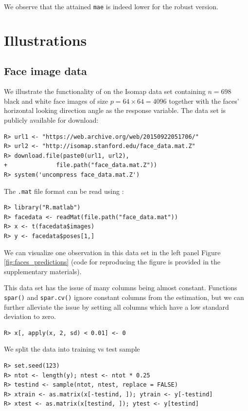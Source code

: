 \documentclass[
  article,
  nojss]{jss}
\begin{document}
We observe that the attained \texttt{mae} is indeed lower for the robust
version.

\section{Illustrations}\label{sec-illustrations}

\subsection{Face image data}\label{face-image-data}

We illustrate the functionality of  on the Isomap data set
containing \(n = 698\) black and white face images of size
\(p = 64 \times 64 = 4096\) together with the faces' horizontal looking
direction angle as the response variable. The data set is publicly
available for download:

\begin{verbatim}
R> url1 <- "https://web.archive.org/web/20150922051706/"
R> url2 <- "http://isomap.stanford.edu/face_data.mat.Z"
R> download.file(paste0(url1, url2),
+              file.path("face_data.mat.Z"))
R> system('uncompress face_data.mat.Z')
\end{verbatim}

The \texttt{.mat} file format can be read using 
\citep{pkg:rmatlab}:

\begin{verbatim}
R> library("R.matlab")
R> facedata <- readMat(file.path("face_data.mat"))
R> x <- t(facedata$images)
R> y <- facedata$poses[1,]
\end{verbatim}

We can visualize one observation in this data set in the left panel
Figure \ref{fig:faces_predictions} (code for reproducing the figure is
provided in the supplementary materials).

This data set has the issue of many columns being almost constant.
Functions \texttt{spar()} and \texttt{spar.cv()} ignore constant columns
from the estimation, but we can further alleviate the issue by setting
all columns which have a low standard deviation to zero.

\begin{verbatim}
R> x[, apply(x, 2, sd) < 0.01] <- 0
\end{verbatim}

We split the data into training vs test sample

\begin{verbatim}
R> set.seed(123)
R> ntot <- length(y); ntest <- ntot * 0.25
R> testind <- sample(ntot, ntest, replace = FALSE)
R> xtrain <- as.matrix(x[-testind, ]); ytrain <- y[-testind]
R> xtest <- as.matrix(x[testind, ]); ytest <- y[testind]
\end{verbatim}
\end{document}

